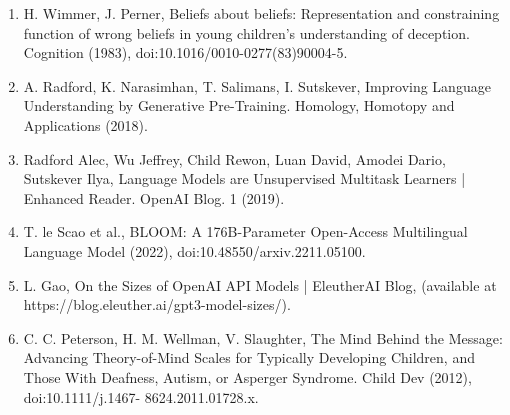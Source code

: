 \documentclass[11pt]{article}
\begin{document}
\begin{enumerate}
\item H. Wimmer, J. Perner, Beliefs about beliefs: Representation and constraining function of wrong beliefs in young children’s understanding of deception. Cognition (1983), doi:10.1016/0010-0277(83)90004-5.
\item A. Radford, K. Narasimhan, T. Salimans, I. Sutskever, Improving Language Understanding by Generative Pre-Training. Homology, Homotopy and Applications (2018).
\item Radford Alec, Wu Jeffrey, Child Rewon, Luan David, Amodei Dario, Sutskever Ilya, Language Models are Unsupervised Multitask Learners | Enhanced Reader. OpenAI Blog. 1 (2019).
\item T. le Scao et al., BLOOM: A 176B-Parameter Open-Access Multilingual Language Model (2022), doi:10.48550/arxiv.2211.05100.
\item L. Gao, On the Sizes of OpenAI API Models | EleutherAI Blog, (available at https://blog.eleuther.ai/gpt3-model-sizes/).
\item C. C. Peterson, H. M. Wellman, V. Slaughter, The Mind Behind the Message: Advancing Theory-of-Mind Scales for Typically Developing Children, and Those With Deafness, Autism, or Asperger Syndrome. Child Dev (2012), doi:10.1111/j.1467- 8624.2011.01728.x.
\end{enumerate}
\end{document}
